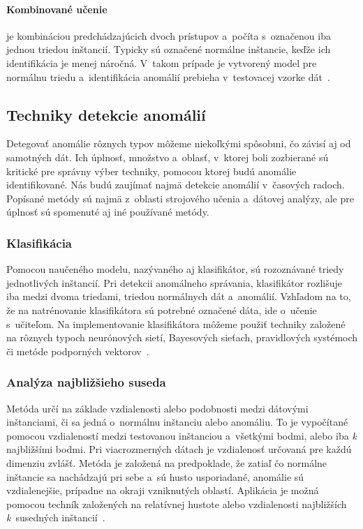 \documentclass[a4paper,twoside,slovak,12pt,appendix]{article}
\begin{document}
\paragraph{Kombinované učenie} je kombináciou predchádzajúcich dvoch prístupov
a~počíta s~označenou iba jednou triedou inštancií. Typicky sú označené normálne
inštancie, keďže ich identifikácia je menej náročná. V~takom prípade je
vytvorený model pre normálnu triedu a~identifikácia anomálií prebieha
v~testovacej vzorke dát~\cite{Chandola2009}.


\subsection{Techniky detekcie anomálií}
\label{c:analysis-techniques}
Detegovať anomálie rôznych typov môžeme niekoľkými spôsobmi, čo závisí aj od
samotných dát. Ich úplnosť, množstvo a~oblasť, v~ktorej boli zozbierané sú
kritické pre správny výber techniky, pomocou ktorej budú anomálie
identifikované. Nás budú zaujímať najmä detekcie anomálií v~časových radoch.
Popísané metódy sú najmä z~oblasti strojového učenia a~dátovej analýzy, ale pre
úplnosť sú spomenuté aj iné používané metódy.

\subsubsection{Klasifikácia}
Pomocou naučeného modelu, nazývaného aj klasifikátor, sú rozoznávané triedy
jednotlivých inštancií. Pri detekcii anomálneho správania, klasifikátor
rozlišuje iba medzi dvoma triedami, triedou normálnych dát a~anomálií. Vzhľadom
na to, že na natrénovanie klasifikátora sú potrebné označené dáta, ide o~učenie
s~učiteľom. Na implementovanie klasifikátora môžeme použiť techniky založené na
rôznych typoch neurónových sietí, Bayesových sieťach, pravidlových systémoch či
metóde podporných vektorov~\cite{Chandola2009,Tan2005}.

\subsubsection{Analýza najbližšieho suseda}
Metóda určí na základe vzdialenosti alebo podobnosti medzi dátovými inštanciami,
či sa jedná o~normálnu inštanciu alebo anomáliu. To je vypočítané pomocou
vzdialeností medzi testovanou inštanciou a~všetkými bodmi, alebo iba \textit{k}
najbližšími bodmi. Pri viacrozmerných dátach je vzdialenosť určovaná pre
každú dimenziu zvlášť. Metóda je založená na predpoklade, že zatiaľ čo normálne
inštancie sa nachádzajú pri sebe a~sú husto usporiadané, anomálie sú
vzdialenejšie, prípadne na okraji vzniknutých oblastí. Aplikácia je možná
pomocou techník založených na relatívnej hustote alebo vzdialenosti najbližších
\textit{k}~susedných inštancií~\cite{Chandola2009,Tan2005}.
\end{document}
